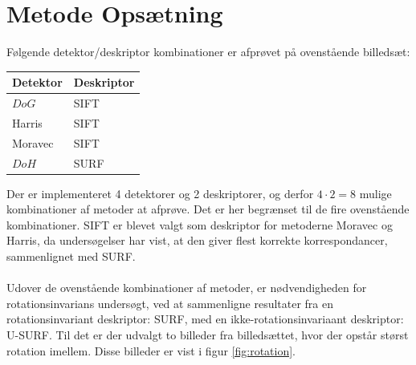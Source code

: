 \section{Metode Opsætning}
Følgende detektor/deskriptor kombinationer er afprøvet på ovenstående billedsæt:
\begin{center}
    \begin{tabular}{ | l | l |}
    \hline
    Detektor & Deskriptor \\ \hline
    $DoG$ & SIFT  \\ \hline       
    Harris & SIFT \\ \hline    
    Moravec & SIFT \\ \hline    
    $DoH$ & SURF\\ \hline    
    \end{tabular}
\end{center}
Der er implementeret 4 detektorer og 2 deskriptorer, og derfor $4\cdot 2=8$ mulige kombinationer af metoder at afprøve. Det er her begrænset til de fire ovenstående kombinationer. SIFT er blevet valgt som deskriptor for metoderne Moravec og Harris, da undersøgelser \cite{kim} har vist, at den giver flest korrekte korrespondancer, sammenlignet med SURF.
\\ \\ 
Udover de ovenstående kombinationer af metoder, er nødvendigheden for rotationsinvarians undersøgt, ved at sammenligne resultater fra en rotationsinvariant deskriptor: SURF, med en ikke-rotationsinvariaant deskriptor: U-SURF. Til det er der udvalgt to billeder fra billedsættet, hvor der opstår størst rotation imellem. Disse billeder er vist i figur \ref{fig:rotation}.